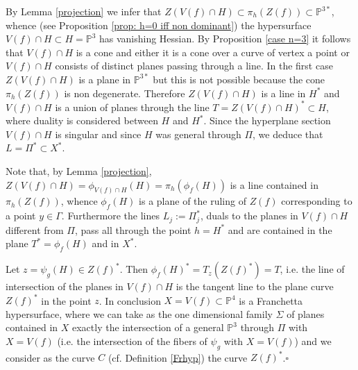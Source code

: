 \documentclass[11pt,a4paper]{amsart}
\newcommand{\erem}{\hfill $\square$}
\begin{document}
By Lemma \ref{projection} we infer that $Z(V(f)\cap H)\subset
\pi_h(Z(f))\subset\mathbb{P}^{3*}$, whence (see Proposition
\ref{prop: h=0 iff non dominant}) the hypersurface $V(f)\cap
H\subset H=\mathbb{P}^3$ has vanishing Hessian. By Proposition
\ref{case n=3} it follows that $V(f)\cap H$ is a cone and either
it is a cone over a curve of vertex a point or $V(f)\cap H$
consists of distinct planes passing through a line. In the first
case $Z(V(f)\cap H)$ is a plane in $\mathbb{P}^{3*}$ but this is
not possible because the cone $\pi_h(Z(f))$ is non degenerate.
Therefore $Z(V(f)\cap H)$ is a line in $H^*$ and $V(f)\cap H$ is a
union of planes through the line $T=Z(V(f)\cap H)^*\subset H$,
where duality is considered between $H$ and $H^*$. Since the
hyperplane section $V(f)\cap H$ is singular and since $H$ was
general through $\Pi$, we deduce that  $L=\Pi^*\subset X^*$.

Note that, by  Lemma \ref{projection}, $Z(V(f)\cap
H)=\phi_{V(f)\cap H}(H)=\pi_h(\phi_f(H))$ is a line contained in
$\pi_h(Z(f))$, whence $\phi_f(H)$ is a plane of the ruling of
$Z(f)$ corresponding to a point $y\in\Gamma$. Furthermore the
lines $L_j:=\Pi_j^*$, duals to the planes in $V(f)\cap H$
different from $\Pi$, pass all through the point $h=H^*$ and are
contained in the plane $T^*=\phi_f(H)$ and in $X^*$.


Let $z=\psi_g(H)\in Z(f)^*$. Then $\phi_f(H)^*=T_z(Z(f)^*)=T$,
i.e. the line of intersection of the planes in $V(f)\cap H$  is
the tangent line to the plane curve $Z(f)^*$ in the point $z$. In
conclusion $X=V(f)\subset\mathbb{P}^4$ is a Franchetta
hypersurface, where we can take as the one dimensional family
$\Sigma$ of planes contained in $X$ exactly the intersection of a
general $\mathbb{P}^3$ through $\Pi$ with $X=V(f)$ (i.e.  the
intersection of the fibers of $\psi_g$ with $X=V(f)$) and we consider as the curve
$C$ (cf. Definition \ref{Frhyp}) the curve $Z(f)^*$.\erem
\end{document}
